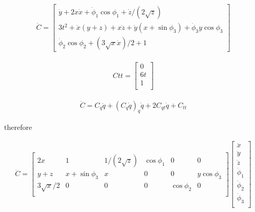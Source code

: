 \documentclass[letterpaper,10pt]{article} %
\begin{document}
\begin{eqnarray*}
	\dot C = \begin{bmatrix} 
		\dot y  + 2x\dot x + \dot \phi_1\cos\phi_1 + \dot z  /(2\sqrt{z})\\
		3t^2 +  \dot x(y + z) + x\dot z  + \dot y(x + \sin\phi_3) + \dot \phi_3y\cos\phi_3\\
		\dot \phi_2\cos\phi_2 + (3\sqrt{x}\dot x)/2 + 1
	\end{bmatrix}
\end{eqnarray*}



\begin{eqnarray*}
	Ctt = \begin{bmatrix} 
		0\\
		6t\\
		1\\
	\end{bmatrix}
\end{eqnarray*}



\begin{eqnarray*}
	\ddot C =C_q \ddot q +(C_q \dot q)_q \dot q+ 2C_{qt} \dot q + C_{tt}
\end{eqnarray*}

therefore


\begin{eqnarray*}
	\ddot C =\begin{bmatrix}
		2x &             1& 1/(2\sqrt{z}) & \cos \phi_1&         0&           0\\
		y + z& x + \sin \phi_3&             x&         0&         0& y \cos \phi_3\\
		3\sqrt{x}/2&             0&             0&         0& \cos \phi_2&           0\\
	\end{bmatrix}
	\begin{bmatrix} 
		\ddot x\\
		\ddot y\\
		\ddot z\\
		\ddot \phi_1\\
		\ddot \phi_2\\
		\ddot \phi_3\\
	\end{bmatrix}
\end{eqnarray*}
\end{document}
